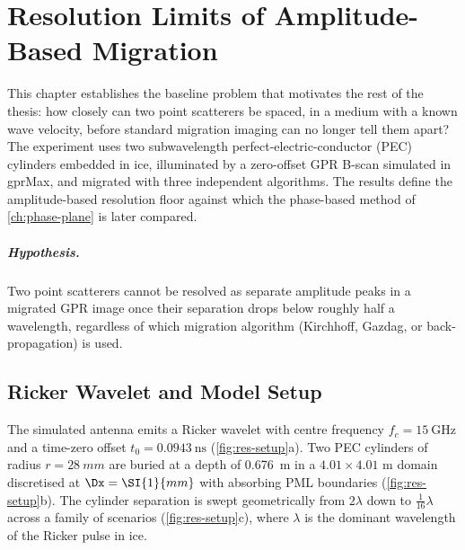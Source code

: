 \chapter{Resolution Limits of Amplitude-Based Migration}
\label{ch:resolution}

This chapter establishes the baseline problem that motivates the rest of the
thesis: how closely can two point scatterers be spaced, in a medium with a
known wave velocity, before standard migration imaging can no longer tell
them apart? The experiment uses two subwavelength perfect-electric-conductor
(PEC) cylinders embedded in ice, illuminated by a zero-offset GPR B-scan
simulated in gprMax, and migrated with three independent algorithms. The
results define the amplitude-based resolution floor against which the
phase-based method of \cref{ch:phase-plane} is later compared.

\paragraph{Hypothesis.} Two point scatterers cannot be resolved as separate
amplitude peaks in a migrated GPR image once their separation drops below
roughly half a wavelength, regardless of which migration algorithm
(Kirchhoff, Gazdag, or back-propagation) is used.

\section{Ricker Wavelet and Model Setup}

The simulated antenna emits a Ricker wavelet with centre frequency
$f_c = \SI{15}{\GHz}$ and a time-zero offset $t_0 = \SI{0.0943}{\ns}$
(\cref{fig:res-setup}a). Two PEC cylinders of radius $r = \SI{28}{mm}$ are
buried at a depth of \SI{0.676}{m} in a $4.01 \times 4.01$ m domain
discretised at $\Dx = \SI{1}{mm}$ with absorbing PML boundaries
(\cref{fig:res-setup}b). The cylinder separation is swept geometrically from
$2\lambda$ down to $\tfrac{1}{16}\lambda$ across a family of scenarios
(\cref{fig:res-setup}c), where $\lambda$ is the dominant wavelength of the
Ricker pulse in ice.

